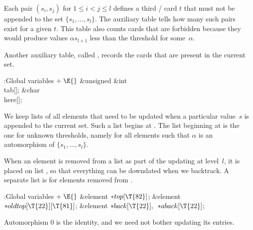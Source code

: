Each pair $(s_i,s_j)$ for $1\le i<j\le l$ defines a third \SET/ card $t$
that must not be appended to the set $\{s_1,\ldots,s_l\}$. The auxiliary
table  tells how many such pairs exist for a given $t$.
This table also counts cards that are forbidden because they would
produce values $\alpha s_{l+1}$ less than the threshold for some~$\alpha$.

Another auxiliary table, called , records the cards that are
present
in the current set.

\Y\B\4:Global variables\X${}\mathrel+\E{}$\6
\&{unsigned} \&{int} \\{tab}[];\6
\&{char} \\{here}[];\par
\fi

We keep lists of all elements that need to be updated when a particular
value~$s$ is appended to the current set. Such a list begins at
. The list beginning at  is the one for
unknown
thresholds, namely for all elements such that $\alpha$ is an automorphism
of $\{s_1,\ldots,s_l\}$.

When an element is removed from a list as part of the updating at level~$l$,
it is placed on list , so that everything can be downdated
when we backtrack. A separate list  is for elements removed
from .

\Y\B\4:Global variables\X${}\mathrel+\E{}$\6
\&{element} ${}{*}\\{top}[\T{82}]{}$;\6
\&{element} ${}{*}\\{oldtop}[\T{22}][\T{81}]{}$;\6
\&{element} ${}{*}\\{back}[\T{22}],{}$ ${}{*}\\{aback}[\T{22}]{}$;\par
\fi

Automorphism 0 is the identity, and we need not bother updating its
entries.

